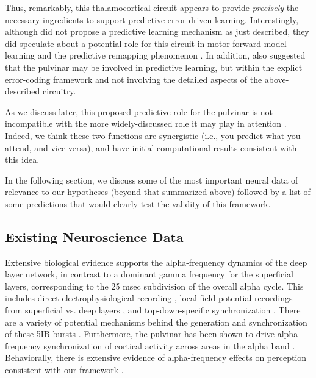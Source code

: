 \documentclass[11pt,twoside]{article}
\newif\myifpdf
\begin{document}
Thus, remarkably, this thalamocortical circuit appears to provide \emph{precisely} the necessary ingredients to support predictive error-driven learning.  Interestingly, although  did not propose a predictive learning mechanism as just described, they did speculate about a potential role for this circuit in motor forward-model learning and the predictive remapping phenomenon \cite{ShermanGuillery11,UsreySherman18}.  In addition,  also suggested that the pulvinar may be involved in predictive learning, but within the explict error-coding framework and not involving the detailed aspects of the above-described circuitry.

As we discuss later, this proposed predictive role for the pulvinar is not incompatible with the more widely-discussed role it may play in attention \cite{LaBergeBuchsbaum90,BenderYouakim01,SnowAllenRafalEtAl09,SaalmannKastner11,ZhouSchaferDesimone16,FiebelkornKastner19}.  Indeed, we think these two functions are synergistic (i.e., you predict what you attend, and vice-versa), and have initial computational results consistent with this idea.

In the following section, we discuss some of the most important neural data of relevance to our hypotheses (beyond that summarized above) followed by a list of some predictions that would clearly test the validity of this framework.

\subsection{Existing Neuroscience Data}

Extensive biological evidence supports the alpha-frequency dynamics of the deep layer network, in contrast to a dominant gamma frequency for the superficial layers, corresponding to the 25 msec subdivision of the overall alpha cycle.  This includes direct electrophysiological recording \cite{LuczakBarthoHarris13}, local-field-potential recordings from superficial vs. deep layers \cite{BuffaloFriesLandmanEtAl11,MaierAdamsAuraEtAl10,MaierAuraLeopold11,SpaakBonnefondMaierEtAl12,XingYehBurnsEtAl12,BastosVezoliBosmanEtAl15,MichalareasVezolivanPeltEtAl16}, and top-down-specific synchronization \cite{vonSteinChiangKonig00,vanKerkoerleSelfDagninoEtAl14}. There are a variety of potential mechanisms behind the generation and synchronization of these 5IB bursts \cite{ConnorsGutnickPrince82,LopesdaSilva91,LorinczKekesiJuhaszEtAl09,FranceschettiGuatteoPanzicaEtAl95,SaalmannPinskWangEtAl12}.  Furthermore, the pulvinar has been shown to drive alpha-frequency synchronization of cortical activity across areas in the alpha band \cite{SaalmannPinskWangEtAl12}.  Behaviorally, there is extensive evidence of alpha-frequency effects on perception consistent with our framework \cite{NunnOsselton74,VarelaToroJohnEtAl81,VanRullenKoch03,JensenBonnefondVanRullen12}.
\end{document}

